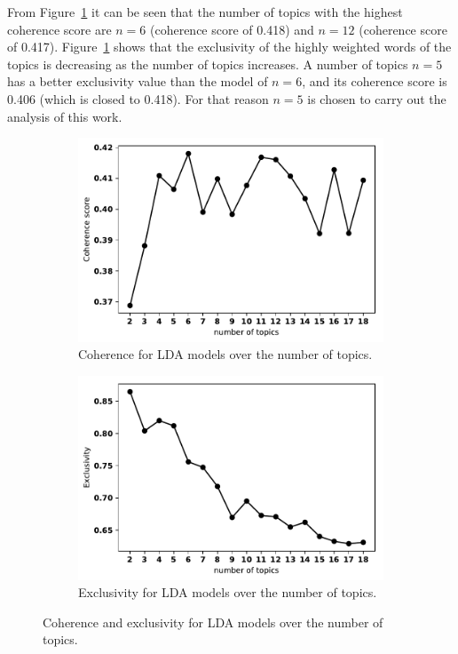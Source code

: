\documentclass{article}
\theoremstyle{definition}
\begin{document}
From Figure~\ref{fig:coherence_value_over_number_of_topics} it can be seen that
the number of topics with the highest coherence score are $n=6$ (coherence score
of 0.418) and $n=12$ (coherence score of 0.417).
Figure~\ref{fig:coherence_value_over_number_of_topics} shows that the
exclusivity of the highly weighted words of the topics is decreasing as the number
of topics increases. A number of topics $n=5$ has a better exclusivity value
than the model of $n=6$, and its coherence score is 0.406 (which is closed to
0.418). For that reason $n=5$ is chosen to carry out the analysis of this work.


\begin{figure}[!hbtp]
    \centering
    \begin{subfigure}{.45\textwidth}
        \centering
        \includegraphics[width=\textwidth]{coherence_values.pdf}
        \caption{Coherence for LDA models over the number of topics.}
        \label{fig:coherence_value_over_number_of_topics}
    \end{subfigure}\hfill
    \begin{subfigure}{.45\textwidth}
        \centering
        \includegraphics[width=\textwidth]{exclusivity_values.pdf}
        \caption{Exclusivity for LDA models over the number of topics.}
        \label{fig:exclusivity_value_over_number_of_topics}
    \end{subfigure}
    \caption{Coherence and exclusivity for LDA models over the number of topics.}\label{figure:models_scores}
\end{figure}
\end{document}
